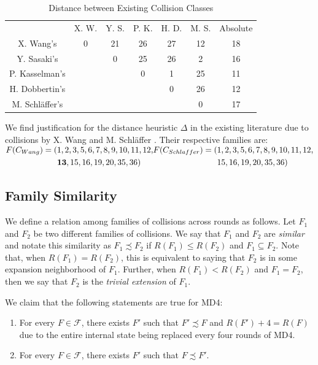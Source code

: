 \documentclass[conference]{IEEEtran}
\begin{document}
\begin{table}
    \caption{Distance between Existing Collision Classes}
    \label{table:distance}
    \begin{tabular}{c c c c c c c}
        & X. W. & Y. S. & P. K. & H. D. & M. S. & Absolute \\
        X. Wang's & 0 & 21 & 26 & 27 & 12 & 18 \\
        Y. Sasaki's & & 0 & 25 & 26 & 2 & 16 \\
        P. Kasselman's &  &  & 0 & 1 & 25 & 11 \\
        H. Dobbertin's &  &  &  & 0 & 26 & 12 \\
        M. Schl{\"a}ffer's &  &  &  &  & 0 & 17 \\
    \end{tabular}
\end{table}

We find justification for the distance heuristic $\Delta$ in the existing
literature due to collisions by  X. Wang \cite{cryptoeprint:2004:199} and
M. Schl{\"a}ffer \cite{Schlaffer2006}. Their respective families are:
$
\begin{aligned}
F(C_{Wang}) = (& 1, 2, 3, 5, 6, 7, 8, 9, 10, 11, 12, \\
        & \textbf{13}, 15, 16, 19, 20, 35, 36) \\
\end{aligned} \\
\begin{aligned}
F(C_{Schlaffer}) = (& 1, 2, 3, 5, 6, 7, 8, 9, 10, 11, 12, \\
         & 15, 16, 19, 20, 35, 36)
\end{aligned}
$



\subsection{Family Similarity}

We define a relation among families of collisions across rounds as follows.
Let $F_1$ and $F_2$ be two different families of collisions. We say that
$F_1$ and $F_2$ are \textit{similar} and notate this similarity as $F_1 \precsim F_2$ if
$R(F_1) \leq R(F_2)$ and $F_1 \subseteq F_2$. Note that, when
$R(F_1) = R(F_2)$, this is equivalent to saying that $F_2$ is in some
expansion neighborhood of $F_1$. Further, when $R(F_1) < R(F_2)$ and
$F_1 = F_2$, then we say that $F_2$ is the \textit{trivial extension} of
$F_1$.

We claim that the following statements are true for MD4:
\begin{enumerate}
    \item For every $F \in \mathcal{F}$, there exists $F'$ such that
        $F' \precsim F$ and $R(F') + 4 = R(F)$ due to the entire
        internal state being replaced every four rounds of MD4.
    \item For every $F \in \mathcal{F}$, there exists $F'$ such that
        $F \precsim F'$.
\end{enumerate}
\end{document}
